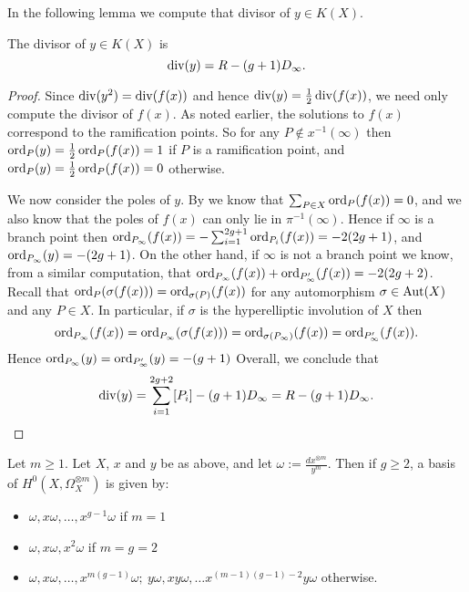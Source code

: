 In the following lemma we compute that divisor of $y \in K(X)$.
    \begin{lem}\label{lemmadivisorofycharacteristicnot2}
    The divisor of $y \in K(X)$ is 
        \begin{equation}\label{equationdivisorofypnot2}
        \operatorname{div}(y)  = R - (g+1)D_\infty.
        \end{equation}
    \end{lem}
    \begin{proof}
    Since $\operatorname{div} (y^2) = \operatorname{div} (f(x))$ and hence $\operatorname{div}(y) = \frac{1}{2}\operatorname{div}(f(x))$, we need only compute the divisor of $f(x)$.
    As noted earlier, the solutions to $f(x)$ correspond to the ramification points.
    So for any $P\notin x^{-1}(\infty)$ then $\operatorname{ord}_P(y) =  \frac{1}{2}\operatorname{ord}_P(f(x)) = 1$ if $P$ is a ramification point, and $\operatorname{ord}_P(y) = \frac{1}{2}\operatorname{ord}_P(f(x)) = 0$ otherwise.

    We now consider the poles of $y$.
    By  we know that $\sum_{P \in X} \operatorname{ord}_P(f(x)) = 0$, and we also know that the poles of $f(x)$ can only lie in $\pi^{-1}(\infty)$.
    Hence if $\infty$ is a branch point then $\operatorname{ord}_{P_\infty}(f(x)) = -\sum_{i=1}^{2g+1}\operatorname{ord}_{P_i}(f(x)) = -2(2g+1)$, and $\operatorname{ord}_{P_\infty}(y) = -(2g+1)$.
    On the other hand, if $\infty$ is not a branch point we know, from a similar computation, that $\operatorname{ord}_{P_\infty}(f(x)) + \operatorname{ord}_{P_\infty'}(f(x)) = -2(2g+2)$.
    Recall that $\operatorname{ord}_{P}(\sigma(f(x))) = \operatorname{ord}_{\sigma(P)}(f(x))$ for any automorphism $\sigma \in \operatorname{Aut}(X)$ and any $P \in X$.
    In particular, if $\sigma$ is the hyperelliptic involution of $X$ then 
        \[
        \operatorname{ord}_{P_\infty}(f(x)) = \operatorname{ord}_{P_\infty}(\sigma(f(x))) = \operatorname{ord}_{\sigma(P_\infty)}(f(x)) = \operatorname{ord}_{P_\infty'}(f(x)).
        \]
    Hence $\operatorname{ord}_{P_\infty}(y) = \operatorname{ord}_{P_\infty'}(y) = -(g+1)$
    Overall, we conclude that
        \[
        \operatorname{div}(y) = \sum_{i=1}^{2g+2} [P_i]- (g+1)D_\infty = R - (g+1)D_{\infty}.
        \]
    \end{proof}


    \begin{prop}\label{prophyperellipticbasispnot2}
    Let $m\geq 1$.
    Let $X$, $x$ and $y$ be as above, and let $\omega := \frac{dx^{\otimes m}}{y^m}$. 
    Then if $g\geq 2$, a basis of $H^0(X,\Omega_X^{\otimes m})$ is given by:
        \begin{itemize}
        \item $\omega, x\omega, \ldots , x^{g-1}\omega$ if $m=1$ 
        \item $\omega, x\omega, x^2\omega$  if $m=g=2$ 
        \item $\omega, x\omega, \ldots, x^{m(g-1)}\omega;\  y\omega, xy\omega, \ldots x^{(m-1)(g-1)-2}y\omega$ otherwise.
        \end{itemize}
    \end{prop}
    
